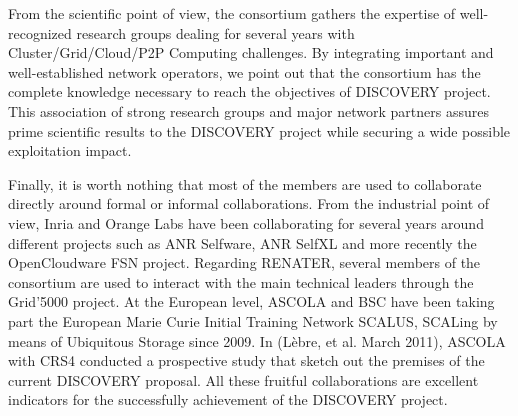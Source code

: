 \documentclass[11pt,a4paper,twoside]{article}
\begin{document}
From the scientific point of view, the consortium gathers the expertise of
well-recognized research groups dealing for several years with
Cluster/Grid/Cloud/P2P Computing challenges. By integrating important and well-established network operators, 
we point out that the consortium has the complete knowledge necessary to reach the objectives of DISCOVERY project.
This association of strong research groups and major network partners assures prime scientific
results to the DISCOVERY project while securing a wide possible exploitation impact. 

Finally, it is worth nothing that most of the members are used to collaborate
directly around formal or informal collaborations. 
%
From the industrial point of view, Inria and Orange Labs have been
collaborating for several years around different projects such as ANR Selfware, ANR SelfXL and
more recently the OpenCloudware FSN project. Regarding RENATER, several members
of the consortium are used to interact with the main technical leaders through
the Grid'5000 project. 
%
At the European level,  ASCOLA and BSC have been taking part the European Marie Curie Initial Training Network
SCALUS, SCALing by means of Ubiquitous Storage since 2009. In (Lèbre, et al.
March 2011), ASCOLA with CRS4 conducted a prospective study that sketch out the
premises of the current DISCOVERY proposal.  
All these fruitful collaborations are
excellent indicators for the successfully achievement of the DISCOVERY project. 
\end{document}
